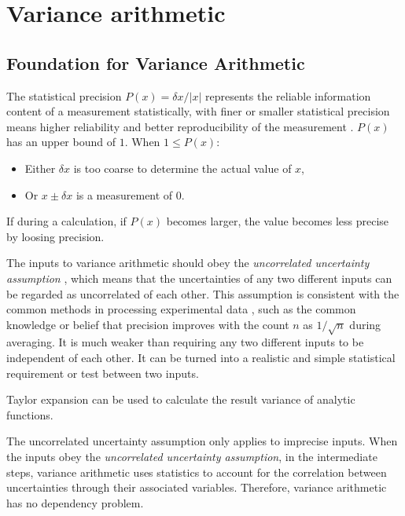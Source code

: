 \documentclass[twoside]{article}
\numberwithin{equation}{section}
\begin{document}
\clearpage
\section{Variance arithmetic}
\label{sec: variance arithmetic}


\subsection{Foundation for Variance Arithmetic}

The statistical precision $P(x) = \delta x/|x|$ represents the reliable information content of a measurement statistically, with finer or smaller statistical precision means higher reliability and better reproducibility of the measurement \cite{Statistical_Methods}\cite{Precisions_Physical_Measurements}. 
$P(x)$ has an upper bound of $1$.
When $1 \leq P(x)$:
\begin{itemize}
\item Either $\delta x$ is too coarse to determine the actual value of $x$, 

\item Or $x \pm \delta x$ is a measurement of $0$.
\end{itemize}
If during a calculation, if $P(x)$ becomes larger, the value becomes less precise by loosing precision.

The inputs to variance arithmetic should obey the \emph{uncorrelated uncertainty assumption} \cite{Prev_Precision_Arithmetic}, which means that the uncertainties of any two different inputs can be regarded as uncorrelated of each other. 
This assumption is consistent with the common methods in processing experimental data \cite{Statistical_Methods}\cite{Precisions_Physical_Measurements}, such as the common knowledge or belief that precision improves with the count $n$ as $1 / \sqrt{n}$ during averaging.
It is much weaker than requiring any two different inputs to be independent of each other.
It can be turned into a realistic and simple statistical requirement or test between two inputs.

Taylor expansion can be used to calculate the result variance of analytic functions.

The uncorrelated uncertainty assumption only applies to imprecise inputs.
When the inputs obey the \emph{uncorrelated uncertainty assumption}, in the intermediate steps, variance arithmetic uses statistics to account for the correlation between uncertainties through their associated variables.
Therefore, variance arithmetic has no dependency problem.
\end{document}
